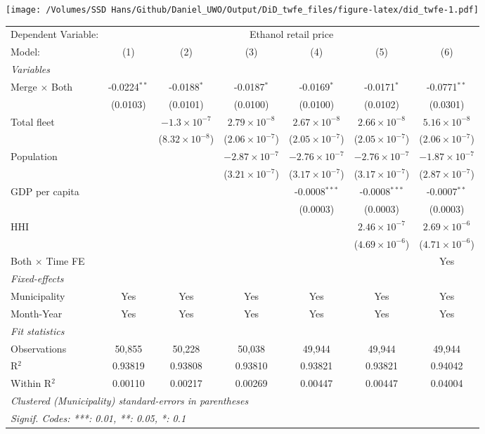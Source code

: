 \documentclass[
]{article}
\begin{document}
\texttt{[image: /Volumes/SSD Hans/Github/Daniel\_UWO/Output/DiD\_twfe\_files/figure-latex/did\_twfe-1.pdf]}

\begin{tabular}{lcccccc}
\tabularnewline\midrule\midrule
Dependent Variable:&\multicolumn{6}{c}{Ethanol retail price}\\
Model:&(1) & (2) & (3) & (4) & (5) & (6)\\
\midrule \emph{Variables}&   &   &   &   &   &  \\
Merge $\times $ Both & -0.0224$^{**}$ & -0.0188$^{*}$ & -0.0187$^{*}$ & -0.0169$^{*}$ & -0.0171$^{*}$ & -0.0771$^{**}$\\
  &(0.0103) & (0.0101) & (0.0100) & (0.0100) & (0.0102) & (0.0301)\\
Total fleet &    & $-1.3\times 10^{-7}$ & $2.79\times 10^{-8}$ & $2.67\times 10^{-8}$ & $2.66\times 10^{-8}$ & $5.16\times 10^{-8}$\\
  &   & ($8.32\times 10^{-8}$) & ($2.06\times 10^{-7}$) & ($2.05\times 10^{-7}$) & ($2.05\times 10^{-7}$) & ($2.06\times 10^{-7}$)\\
Population &    &    & $-2.87\times 10^{-7}$ & $-2.76\times 10^{-7}$ & $-2.76\times 10^{-7}$ & $-1.87\times 10^{-7}$\\
  &   &    & ($3.21\times 10^{-7}$) & ($3.17\times 10^{-7}$) & ($3.17\times 10^{-7}$) & ($2.87\times 10^{-7}$)\\
GDP per capita &    &    &    & -0.0008$^{***}$ & -0.0008$^{***}$ & -0.0007$^{**}$\\
  &   &    &    & (0.0003) & (0.0003) & (0.0003)\\
HHI &    &    &    &    & $2.46\times 10^{-7}$ & $2.69\times 10^{-6}$\\
  &   &    &    &    & ($4.69\times 10^{-6}$) & ($4.71\times 10^{-6}$)\\
Both $\times$ Time FE &  &  &  &  &  & Yes\\
\midrule \emph{Fixed-effects}&   &   &   &   &   &  \\
Municipality & Yes & Yes & Yes & Yes & Yes & Yes\\
Month-Year & Yes & Yes & Yes & Yes & Yes & Yes\\
\midrule \emph{Fit statistics}&  & & & & & \\
Observations & 50,855&50,228&50,038&49,944&49,944&49,944\\
R$^2$ & 0.93819&0.93808&0.93810&0.93821&0.93821&0.94042\\
Within R$^2$ & 0.00110&0.00217&0.00269&0.00447&0.00447&0.04004\\
\midrule\midrule\multicolumn{7}{l}{\emph{Clustered (Municipality) standard-errors in parentheses}}\\
\multicolumn{7}{l}{\emph{Signif. Codes: ***: 0.01, **: 0.05, *: 0.1}}\\
\end{tabular}
\end{document}
